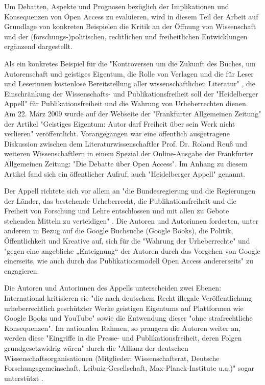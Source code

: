 Um Debatten, Aspekte und Prognosen bezüglich der Implikationen und Konsequenzen von Open Access zu evaluieren, wird in diesem Teil der Arbeit auf Grundlage von konkreten Beispielen die Kritik an der Öffnung von Wissenschaft und der (forschungs-)politischen, rechtlichen und freiheitlichen Entwicklungen ergänzend dargestellt.

Als ein konkretes Beispiel für die "Kontroversen um die Zukunft des Buches, um Autorenschaft und geistiges Eigentum, die Rolle von Verlagen und die für Leser und Leserinnen kostenlose Bereitstellung aller wissenschaftlichen Literatur" \cite{Hagner_2015}, die Einschränkung der Wissenschafts- und Publikationsfreiheit soll der "Heidelberger Appell" für Publikationsfreiheit und die Wahrung von Urheberrechten dienen. Am 22. März 2009 wurde auf der Webseite der "Frankfurter Allgemeinen Zeitung" der Artikel "Geistiges Eigentum: Autor darf Freiheit über sein Werk nicht verlieren" \cite{Heidelberger_Appell_2009} veröffentlicht. Vorangegangen war eine öffentlich ausgetragene Diskussion zwischen dem Literaturwissenschaftler Prof. Dr. Roland Reuß und weiteren Wissenschaftlern in einem Spezial der Online-Ausgabe der Frankfurter Allgemeinen Zeitung: "Die Debatte über Open Access". Im Anhang zu diesem Artikel fand sich ein öffentlicher Aufruf, auch "Heidelberger Appell" genannt.

Der Appell richtete sich vor allem an "die Bundesregierung und die Regierungen der Länder, das bestehende Urheberrecht, die Publikationsfreiheit und die Freiheit von Forschung und Lehre entschlossen und mit allen zu Gebote stehenden Mitteln zu verteidigen" \cite{ITK_2009}. Die Autoren und Autorinnen forderten, unter anderem in Bezug auf die Google Buchsuche (Google Books), die Politik, Öffentlichkeit und Kreative auf, sich für die "Wahrung der Urheberrechte" und "gegen eine angebliche „Enteignung“ der Autoren durch das Vorgehen von Google einerseits, wie auch durch das Publikationsmodell Open Access andererseits" \cite{Cloes_2009} zu engagieren.

Die Autoren und Autorinnen des Appells unterscheiden zwei Ebenen: International kritisieren sie "die nach deutschem Recht illegale Veröffentlichung urheberrechtlich geschützter Werke geistigen Eigentums auf Plattformen wie Google Books und YouTube" sowie die Entwendung dieser "ohne strafrechtliche Konsequenzen". Im nationalen Rahmen, so prangern die Autoren weiter an, werden diese "Eingriffe in die Presse- und Publikationsfreiheit, deren Folgen grundgesetzwidrig wären" durch die "Allianz der deutschen Wissenschaftsorganisationen (Mitglieder: Wissenschaftsrat, Deutsche Forschungsgemeinschaft, Leibniz-Gesellschaft, Max-Planck-Institute u.a.)" sogar unterstützt \cite{ITK_2009}.

